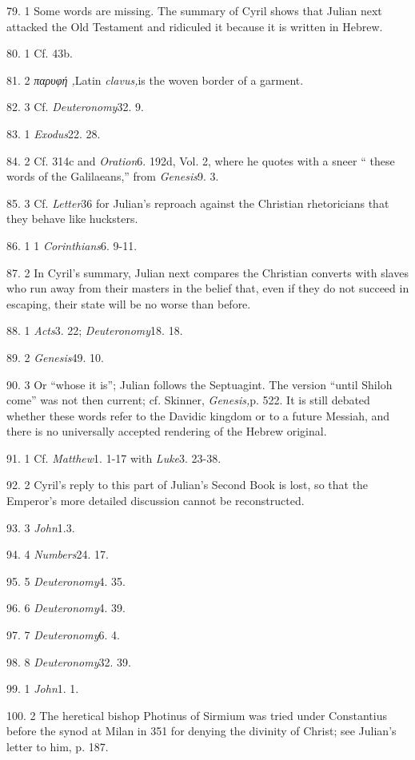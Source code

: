 79. 1 Some words are missing. The summary of Cyril shows that Julian next attacked the Old Testament and ridiculed it because it is written in Hebrew.

80. 1 Cf. 43b.

81. 2 \emph{παρυφή ,}Latin \emph{clavus,}is the woven border of a garment.

82. 3 Cf. \emph{Deuteronomy}32. 9.

83. 1 \emph{Exodus}22. 28.

84. 2 Cf. 314c and \emph{Oration}6. 192d, Vol. 2, where he quotes with a sneer `` these words of the Galilaeans,'' from \emph{Genesis}9. 3.

85. 3 Cf. \emph{Letter}36 for Julian's reproach against the Christian rhetoricians that they behave like hucksters.

86. 1 1 \emph{Corinthians}6. 9-11.

87. 2 In Cyril's summary, Julian next compares the Christian converts with slaves who run away from their masters in the
belief that, even if they do not succeed in escaping, their state will be no worse than before.

88. 1 \emph{Acts}3. 22; \emph{Deuteronomy}18. 18.

89. 2 \emph{Genesis}49. 10.

90. 3 Or ``whose it is''; Julian follows the Septuagint. The version ``until Shiloh come'' was not then current; cf. Skinner, \emph{Genesis,}p. 522. It is still debated whether these
words refer to the Davidic kingdom or to a future Messiah, and there is no universally accepted rendering of the Hebrew original.

91. 1 Cf. \emph{Matthew}1. 1-17 with \emph{Luke}3. 23-38.

92. 2 Cyril's reply to this part of Julian's Second Book is lost, so that the Emperor's more detailed discussion cannot be reconstructed.

93. 3 \emph{John}1.3.

94. 4 \emph{Numbers}24. 17.

95. 5 \emph{Deuteronomy}4. 35.

96. 6 \emph{Deuteronomy}4. 39.

97. 7 \emph{Deuteronomy}6. 4.

98. 8 \emph{Deuteronomy}32. 39.

99. 1 \emph{John}1. 1.

100. 2 The heretical bishop Photinus of Sirmium was tried under Constantius before the synod at Milan in 351 for denying the divinity of Christ; see Julian's letter to him, p. 187.

